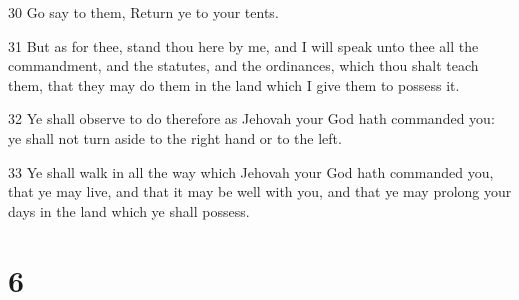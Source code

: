 \par 30 Go say to them, Return ye to your tents.
\par 31 But as for thee, stand thou here by me, and I will speak unto thee all the commandment, and the statutes, and the ordinances, which thou shalt teach them, that they may do them in the land which I give them to possess it.
\par 32 Ye shall observe to do therefore as Jehovah your God hath commanded you: ye shall not turn aside to the right hand or to the left.
\par 33 Ye shall walk in all the way which Jehovah your God hath commanded you, that ye may live, and that it may be well with you, and that ye may prolong your days in the land which ye shall possess.

\chapter{6}

